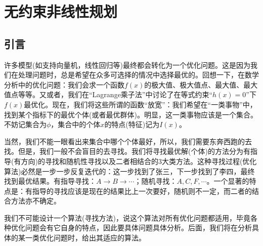 
\chapter{无约束非线性规划}
\section{引言}
    \par
    许多模型(如支持向量机，线性回归等)最终都会转化为一个优化问题。这是因为我们在处理问题时，总是希望在众多可选择的情况中选择最优的。回想一下，在数学分析中的优化问题：我们会求一个函数$f(x)$的极大值、极大值点、最大值、最大值点等等。又或者，我们在“Lagrange乘子法”中讨论了在等式约束“$h(x)=0$”下$f(x)$最优化。现在，我们将这些所谓的函数“放宽”：我们希望在“一类事物”中，找到某个指标下的最优个体(或者最优群体)。明显，这一类事物应该是一个集合。不妨记集合为$\phi$，集合中的个体$x$的特点(特征)记为$I(x)$。
    \par
    当然，我们不能一眼看出来集合中哪个个体最好，所以，我们需要东奔西跑的去找。但是，我们一般不会盲目的去寻找。我们将寻找最优解(个体)的方法分为有指导(有方向)的寻找和随机性寻找以及二者相结合的3大类方法。这种寻找过程(优化算法)必然是一步一步反复迭代的：这一步找到了张三，下一步找到了李四，最终找到最优结果。有指导寻找：$A \rightarrow B \rightarrow \cdots$；随机寻找：$A,C,F,\cdots$。一个显著的特点是：有指导的寻找应该是现在的结果比上一次要好，随机则不一定，而二者的结合方法亦不确定。
    \par
    我们不可能设计一个算法(寻找方法)，说这个算法对所有优化问题都适用，毕竟各种优化问题会有它自身的特点，因此要具体问题具体分析。后面，我们将在分析具体的某一类优化问题时，给出其适应的算法。
